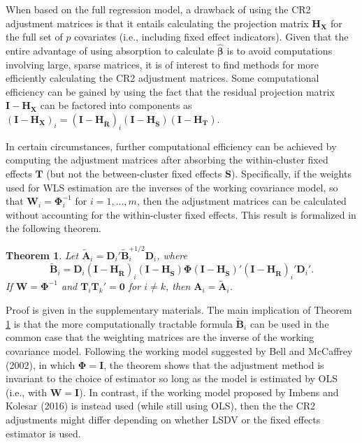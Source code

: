 \documentclass[12pt]{article}
\newtheorem{thm}{Theorem}
\begin{document}
When based on the full regression model, a drawback of using the CR2
adjustment matrices is that it entails calculating the projection matrix
\(\mathbf{H_X}\) for the full set of \(p\) covariates (i.e., including
fixed effect indicators). Given that the entire advantage of using
absorption to calculate \(\hat{\boldsymbol\beta}\) is to avoid
computations involving large, sparse matrices, it is of interest to find
methods for more efficiently calculating the CR2 adjustment matrices.
Some computational efficiency can be gained by using the fact that the
residual projection matrix \(\mathbf{I} - \mathbf{H_X}\) can be factored
into components as
\(\left(\mathbf{I} - \mathbf{H_X}\right)_i = \left(\mathbf{I} - \mathbf{H_{\ddot{R}}}\right)_i \left(\mathbf{I} - \mathbf{H_{\ddot{S}}}\right) \left(\mathbf{I} - \mathbf{H_T}\right)\).

In certain circumstances, further computational efficiency can be
achieved by computing the adjustment matrices after absorbing the
within-cluster fixed effects \(\mathbf{T}\) (but not the between-cluster
fixed effects \(\mathbf{S}\)). Specifically, if the weights used for WLS
estimation are the inverses of the working covariance model, so that
\(\mathbf{W}_i = \boldsymbol\Phi_i^{-1}\) for \(i = 1,...,m\), then the
adjustment matrices can be calculated without accounting for the
within-cluster fixed effects. This result is formalized in the following
theorem.

\begin{thm}
\label{thm:absorb}
Let $\mathbf{\tilde{A}}_i = \mathbf{D}_i'\mathbf{\tilde{B}}_i^{+1/2} \mathbf{D}_i$, where 
\begin{equation}
\label{eq:CR2_B_tilde}
\mathbf{\tilde{B}}_i = \mathbf{D}_i\left(\mathbf{I} - \mathbf{H_{\ddot{R}}}\right)_i \left(\mathbf{I} - \mathbf{H_{\ddot{S}}}\right) \boldsymbol\Phi \left(\mathbf{I} - \mathbf{H_{\ddot{S}}}\right)' \left(\mathbf{I} - \mathbf{H_{\ddot{R}}}\right)_i' \mathbf{D}_i'.
\end{equation}
If $\mathbf{W} = \boldsymbol\Phi^{-1}$ and $\mathbf{T}_i \mathbf{T}_k' = \mathbf{0}$ for $i \neq k$, then $\mathbf{A}_i = \mathbf{\tilde{A}}_i$. 
\end{thm}

Proof is given in the supplementary materials. The main implication of
Theorem \ref{thm:absorb} is that the more computationally tractable
formula \(\mathbf{\tilde{B}}_i\) can be used in the common case that the
weighting matrices are the inverse of the working covariance model.
Following the working model suggested by Bell and McCaffrey (2002), in
which \(\boldsymbol\Phi = \mathbf{I}\), the theorem shows that the
adjustment method is invariant to the choice of estimator so long as the
model is estimated by OLS (i.e., with \(\mathbf{W} = \mathbf{I}\)). In
contrast, if the working model proposed by Imbens and Kolesar (2016) is
instead used (while still using OLS), then the the CR2 adjustments might
differ depending on whether LSDV or the fixed effects estimator is used.
\end{document}
